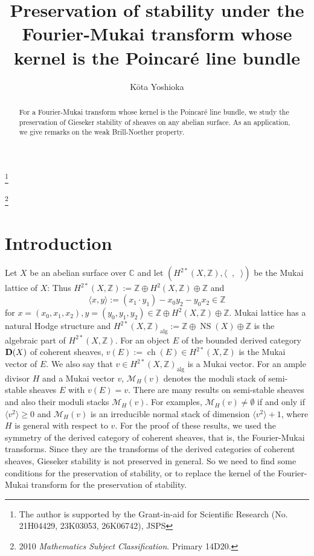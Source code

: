 \documentclass[10pt]{amsart}
\def\cal{\mathcal}
\def\Bbb{\mathbb}
\newcommand{\ch}{\operatorname{ch}}
\newcommand{\NS}{\operatorname{NS}}
\newcommand{\alg}{\operatorname{alg}}
\numberwithin{equation}{section}
\theoremstyle{plain}
\theoremstyle{definition}
\theoremstyle{remark}
\begin{document}
\title{Preservation of stability under
the Fourier-Mukai transform whose kernel is the Poincar\'{e} line bundle}
\author{K\={o}ta Yoshioka}
\address{Department of Mathematics, Faculty of Science,
Kobe University,
Kobe, 657, Japan
}

\thanks{
The author is supported by the Grant-in-aid for 
Scientific Research (No. 21H04429, %
23K03053, 26K06742), JSPS}

\begin{abstract}
For a Fourier-Mukai transform whose kernel is the Poincar\'{e} line bundle,
we study the preservation of Gieseker stability of sheaves on any abelian surface. 
As an application, we give remarks on the weak Brill-Noether property.
\end{abstract}

\maketitle


\renewcommand{\thefootnote}{\fnsymbol{footnote}}
\footnote[0]{2010 \textit{Mathematics Subject Classification}. 
Primary 14D20.}


\section{Introduction}

Let $X$ be an abelian surface over ${\Bbb C}$ and
let $(H^{2*}(X,{\Bbb Z}),\langle\;\;,\;\; \rangle)$ be the Mukai lattice of $X$:
Thus 
$H^{2*}(X,{\Bbb Z}):={\Bbb Z} \oplus H^2(X,{\Bbb Z}) \oplus {\Bbb Z}$ and
\begin{equation*}
\langle x,y \rangle:=(x_1 \cdot y_1)-x_0 y_2-y_0 x_2 \in {\Bbb Z}
\end{equation*}
for $x=(x_0,x_1,x_2), y=(y_0,y_1,y_2) \in  {\Bbb Z} \oplus H^2(X,{\Bbb Z}) \oplus {\Bbb Z}$.
Mukai lattice has  a natural Hodge structure and
$H^{2*}(X,{\Bbb Z})_{\alg}:={\Bbb Z} \oplus \NS(X) \oplus {\Bbb Z}$ is the algebraic
part of $H^{2*}(X,{\Bbb Z})$.
For an object $E$ of the bounded derived category ${\bf D}(X)$ of
coherent sheaves, 
$v(E):=\ch(E) \in H^{2*}(X,{\Bbb Z})$ is the Mukai vector of $E$. 
We also say that $v \in H^{2*}(X,{\Bbb Z})_{\alg}$ is a Mukai vector.
For an ample divisor $H$ and a Mukai vector $v$,
${\cal M}_H(v)$ denotes the moduli stack of semi-stable sheaves $E$ with $v(E)=v$.
There are many results on semi-stable sheaves and also their moduli stacks ${\cal M}_H(v)$.
For examples, ${\cal M}_H(v) \ne \emptyset$ if and only if $\langle v^2 \rangle \geq 0$
and ${\cal M}_H(v)$ is an irreducible normal stack of dimension $\langle v^2 \rangle+1$, where
$H$ is general with respect to $v$.   
For the proof of these results, we used the symmetry of the derived category of coherent sheaves, that is,
the Fourier-Mukai transforms.
Since they are the transforms of the derived categories of coherent sheaves,
Gieseker stability is not preserved in general.
So we need to
find some conditions for the preservation of stability, or to replace 
the kernel of  the Fourier-Mukai transform for the preservation of stability.
\end{document}

